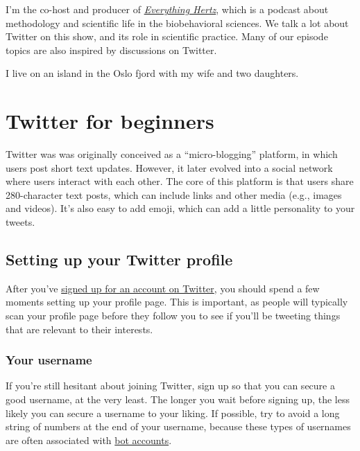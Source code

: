 \documentclass[]{book}
\begin{document}
I'm the co-host and producer of \href{https://everythinghertz.com/}{\emph{Everything Hertz}}, which is a podcast about methodology and scientific life in the biobehavioral sciences. We talk a lot about Twitter on this show, and its role in scientific practice. Many of our episode topics are also inspired by discussions on Twitter.

I live on an island in the Oslo fjord with my wife and two daughters.

\hypertarget{beginner}{%
\chapter{Twitter for beginners}\label{beginner}}

Twitter was was originally conceived as a ``micro-blogging'' platform, in which users post short text updates. However, it later evolved into a social network where users interact with each other. The core of this platform is that users share 280-character text posts, which can include links and other media (e.g., images and videos). It's also easy to add emoji, which can add a little personality to your tweets.

\hypertarget{setting-up-your-twitter-profile}{%
\section{Setting up your Twitter profile}\label{setting-up-your-twitter-profile}}

After you've \href{https://twitter.com/}{signed up for an account on Twitter}, you should spend a few moments setting up your profile page. This is important, as people will typically scan your profile page before they follow you to see if you'll be tweeting things that are relevant to their interests.

\hypertarget{your-username}{%
\subsection{Your username}\label{your-username}}

If you're still hesitant about joining Twitter, sign up so that you can secure a good username, at the very least. The longer you wait before signing up, the less likely you can secure a username to your liking. If possible, try to avoid a long string of numbers at the end of your username, because these types of usernames are often associated with \href{https://en.wikipedia.org/wiki/Twitter_bot}{bot accounts}.
\end{document}
